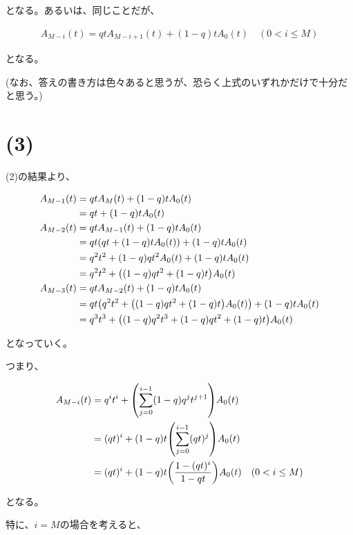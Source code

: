 \documentclass[a4paper, 10pt, dvipdfmx]{jlreq}
\begin{document}
となる。あるいは、同じことだが、

\begin{align*}
    A_{M-i}(t)=qtA_{M-i+1}(t)+(1-q)tA_0(t) \quad (0 < i \leq M)
\end{align*}

となる。

(なお、答えの書き方は色々あると思うが、恐らく上式のいずれかだけで十分だと思う。)

\section*{(3)}

 (2)の結果より、

\begin{align*}
    A_{M-1}(t) & =qtA_{M}(t)+(1-q)tA_0(t)                                  \\
               & =qt+(1-q)tA_0(t)                                          \\
    A_{M-2}(t) & =qtA_{M-1}(t)+(1-q)tA_0(t)                                \\
               & =qt\qty(qt+(1-q)tA_0(t))+(1-q)tA_0(t)                     \\
               & =q^2t^2+(1-q)qt^2A_0(t)+(1-q)tA_0(t)                      \\
               & =q^2t^2+\qty((1-q)qt^2+(1-q)t)A_0(t)                      \\
    A_{M-3}(t) & =qtA_{M-2}(t)+(1-q)tA_0(t)                                \\
               & =qt\qty(q^2t^2+\qty((1-q)qt^2+(1-q)t)A_0(t))+(1-q)tA_0(t) \\
               & =q^3t^3+\qty((1-q)q^2t^3+(1-q)qt^2+(1-q)t)A_0(t)          \\
\end{align*}


となっていく。

つまり、

\begin{align*}
    A_{M-i}(t) & =q^it^i+\qty(\sum_{j=0}^{i-1}(1-q)q^{j}t^{j+1})A_0(t)                \\
               & =(qt)^i+(1-q)t\qty(\sum_{j=0}^{i-1}(qt)^{j})A_0(t)                   \\
               & =(qt)^i+(1-q)t\qty(\frac{1-(qt)^i}{1-qt})A_0(t) \quad (0 < i \leq M)
\end{align*}

となる。

特に、$i=M$の場合を考えると、
\end{document}
